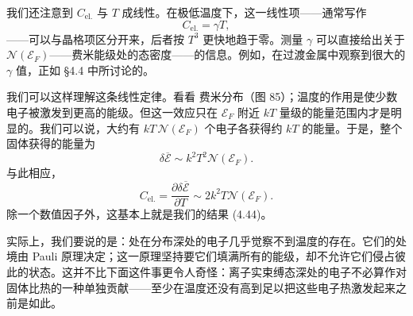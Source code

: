 我们还注意到 $C_{\mathrm{el.}}$ 与 $T$ 成线性。在极低温度下，这一线性项——通常写作
\begin{equation*}
C_{\mathrm{el.}} = \gamma T,
\tag{4.46}
\end{equation*}
——可以与晶格项区分开来，后者按 $T^3$ 更快地趋于零。测量 $\gamma$ 可以直接给出关于 $\mathcal{N}(\mathcal{E}_F)$——费米能级处的态密度——的信息。例如，在过渡金属中观察到很大的 $\gamma$ 值，正如 §4.4 中所讨论的。

我们可以这样理解这条线性定律。看看 费米分布（图 85）；温度的作用是使少数电子被激发到更高的能级。但这一效应只在 $\mathcal{E}_F$ 附近 $kT$ 量级的能量范围内才是明显的。我们可以说，大约有 $kT\,\mathcal{N}(\mathcal{E}_F)$ 个电子各获得约 $kT$ 的能量。于是，整个固体获得的能量为
\begin{equation*}
\delta\overline{\mathcal{E}} \sim k^2T^2\mathcal{N}(\mathcal{E}_F).
\tag{4.47}
\end{equation*}
与此相应，
\begin{equation*}
C_{\mathrm{el.}} = \frac{\partial \delta\overline{\mathcal{E}}}{\partial T} \sim 2k^2T\mathcal{N}(\mathcal{E}_F).
\tag{4.48}
\end{equation*}
除一个数值因子外，这基本上就是我们的结果 (4.44)。


实际上，我们要说的是：处在分布深处的电子几乎觉察不到温度的存在。它们的处境由 Pauli 原理决定；这一原理坚持要它们填满所有的能级，却不允许它们侵占彼此的状态。这并不比下面这件事更令人奇怪：离子实束缚态深处的电子不必算作对固体比热的一种单独贡献——至少在温度还没有高到足以把这些电子热激发起来之前是如此。
